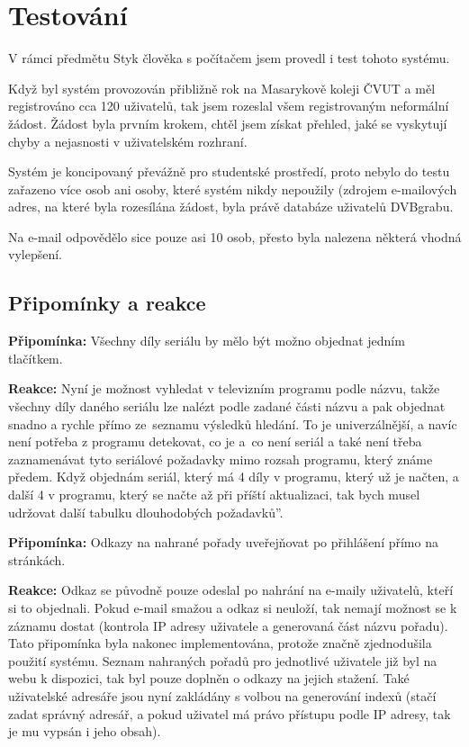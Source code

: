 \chapter{Testování}

V rámci předmětu Styk člověka s počítačem jsem provedl i test tohoto systému.

Když byl systém provozován přibližně rok na Masarykově koleji ČVUT a měl registrováno cca 120 uživatelů, tak jsem rozeslal všem registrovaným neformální žádost. Žádost byla prvním krokem, chtěl jsem získat přehled, jaké se vyskytují chyby a nejasnosti v uživatelském rozhraní. 

Systém je koncipovaný převážně pro studentské prostředí, proto nebylo do testu zařazeno více osob ani osoby, které systém nikdy nepoužily (zdrojem e-mailových adres, na které byla rozesílána žádost, byla právě databáze uživatelů DVBgrabu.

Na e-mail odpovědělo sice pouze asi 10 osob, přesto byla nalezena některá vhodná vylepšení.

\section{Připomínky a reakce}

\textbf{Připomínka:} Všechny díly seriálu by mělo být možno objednat jedním tlačítkem.

\textbf{Reakce:} Nyní je možnost vyhledat v televizním programu podle názvu, takže všechny díly daného seriálu lze nalézt podle zadané části názvu a pak objednat snadno a rychle přímo ze~seznamu výsledků hledání. To je univerzálnější, a navíc není potřeba z programu detekovat, co je a~co není seriál a také není třeba zaznamenávat tyto seriálové požadavky mimo rozsah programu, který známe předem. Když objednám seriál, který má 4 díly v programu, který už je načten, a další 4 v programu, který se načte až při příští aktualizaci, tak bych musel udržovat další tabulku \quotedblbase dlouhodobých požadavků''.

\bigskip
 
\textbf{Připomínka:} Odkazy na nahrané pořady uveřejňovat po přihlášení přímo na stránkách. 

\textbf{Reakce:} Odkaz se původně pouze odeslal po nahrání na e-maily uživatelů, kteří si to objednali. Pokud e-mail smažou a odkaz si neuloží, tak nemají možnost se k záznamu dostat (kontrola IP adresy uživatele a generovaná část názvu pořadu). Tato připomínka byla nakonec implementována, protože značně zjednodušila použití systému. Seznam nahraných pořadů pro jednotlivé uživatele již byl na webu k dispozici, tak byl pouze doplněn o odkazy na jejich stažení. Také uživatelské adresáře jsou nyní zakládány s volbou na generování indexů (stačí zadat správný adresář, a pokud uživatel má právo přístupu podle IP adresy, tak je mu vypsán i jeho obsah).


